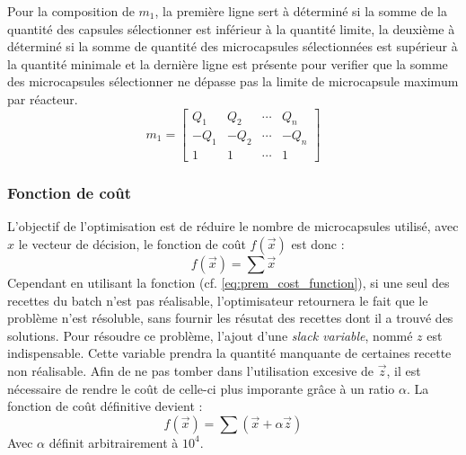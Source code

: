 Pour la composition de $m_1$, la première ligne sert à déterminé si la somme de la quantité des capsules sélectionner est inférieur à la quantité limite, la deuxième à déterminé si la somme de  quantité des \glspl{microcapsule} sélectionnées est supérieur à la quantité minimale et la dernière ligne est présente pour verifier que la somme des \glspl{microcapsule} sélectionner ne dépasse pas la limite de \gls{microcapsule} maximum par réacteur.
\begin{equation}
    m_1 = \left[\begin{array}{cccc}
        Q_1  & Q_2  & \cdots & Q_n\\
        -Q_1 & -Q_2 & \cdots & -Q_n\\
        1    & 1    & \cdots & 1
    \end{array}\right]
\end{equation}
\subsubsection{Fonction de coût}\label{subsubsection:fonction_de_cout}
L'objectif de l'optimisation est de réduire le nombre de \glspl{microcapsule} utilisé, avec $x$ le vecteur de décision, le fonction de coût $f(\overrightarrow{x} )$ est donc : 
\begin{equation}
    f\left(\overrightarrow{x}\right) = \sum \overrightarrow{x} 
    \label{eq:prem_cost_function}
\end{equation}
Cependant en utilisant la fonction (cf. \autoref{eq:prem_cost_function}), si une seul des recettes du batch n'est pas réalisable, l'optimisateur retournera le fait que le problème n'est résoluble, sans fournir les résutat des recettes dont il a trouvé des solutions. Pour résoudre ce problème, l'ajout d'une \textit{slack variable}, nommé $z$ est indispensable. Cette variable prendra la quantité manquante de certaines recette non réalisable. Afin de ne pas tomber dans l'utilisation excesive de $\overrightarrow{z}$, il est nécessaire de rendre le coût de celle-ci plus imporante grâce à un ratio $\alpha$. La fonction de coût définitive devient :
\begin{equation}
    f\left(\overrightarrow{x}\right) = \sum\left(\overrightarrow{x} + \alpha \overrightarrow{z} \right)
    \label{eq:cost_function}
\end{equation}
Avec $\alpha$ définit arbitrairement à $10^{4}$.